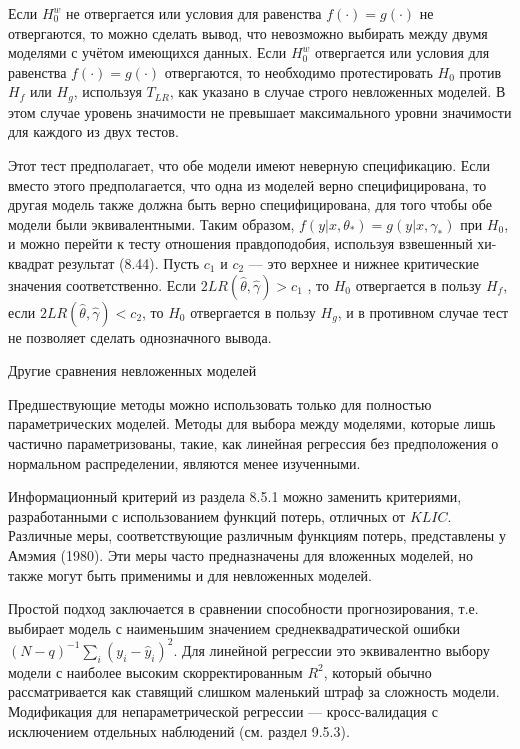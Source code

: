 Если $H_0^w$ не отвергается или условия для равенства $f(\cdot) = g(\cdot)$ не отвергаются, то можно сделать вывод, что невозможно выбирать между двумя моделями с учётом имеющихся данных. Если $H_0^w$ отвергается или  условия для равенства $f(\cdot) = g(\cdot)$  отвергаются, то необходимо протестировать $H_0$ против $H_f$ или $H_g$, используя $T_{LR}$, как указано в случае строго невложенных моделей. В этом случае уровень значимости не превышает максимального уровни значимости для каждого из двух тестов.

Этот тест предполагает, что обе модели имеют неверную спецификацию. Если вместо этого предполагается, что одна из моделей верно специфицирована, то другая модель также должна быть верно специфицирована, для того чтобы обе модели были эквивалентными. Таким образом, $f(y|x, \theta_*) = g(y|x, \gamma_*)$ при $H_0$, и можно перейти к тесту отношения правдоподобия, используя взвешенный хи-квадрат результат (8.44). Пусть $c_1$ и $c_2$ --- это верхнее и нижнее критические значения соответственно. Если $2LR(\hat{\theta}, \hat{\gamma}) > c_1$ , то $H_0$ отвергается в пользу $H_f$, если $2LR(\hat{\theta}, \hat{\gamma}) < c_2$, то $H_0$ отвергается в пользу $H_g$, и в противном случае тест не позволяет сделать однозначного  вывода.

\begin{center}
Другие сравнения невложенных моделей
\end{center}

Предшествующие методы можно использовать только для полностью параметрических моделей. Методы для выбора между моделями, которые лишь частично параметризованы, такие, как линейная регрессия без предположения о нормальном распределении, являются менее изученными.

Информационный критерий из раздела 8.5.1 можно заменить критериями, разработанными с использованием функций потерь, отличных от $KLIC$. Различные меры, соответствующие различным функциям потерь, представлены у Амэмия (1980). Эти меры часто предназначены для вложенных моделей, но также могут быть применимы и для невложенных моделей.

Простой подход заключается в сравнении способности прогнозирования, т.е. выбирает модель с наименьшим значением среднеквадратической ошибки $(N - q)^{-1}\sum_i (y_i - \hat{y}_i)^2$. Для линейной регрессии это эквивалентно выбору модели с наиболее высоким скорректированным $R^2$, который обычно рассматривается как ставящий слишком маленький штраф за сложность модели. Модификация для непараметрической регрессии --- кросс-валидация с исключением отдельных наблюдений (см. раздел 9.5.3).

